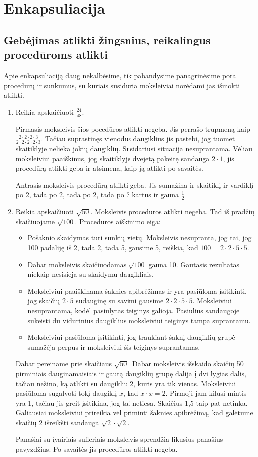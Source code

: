 \documentclass{article}
\begin{document}
\section{Enkapsuliacija}
\subsection{Gebėjimas atlikti žingsnius, reikalingus procedūroms atlikti}
Apie enkapsuliaciją daug nekalbėsime, tik pabandysime panagrinėsime pora procedūrų ir sunkumus, su kuriais susiduria moksleiviai norėdami jas išmokti atlikti.
\begin{enumerate}
\item Reikia apskaičiuoti $\frac{24}{48}$. 

Pirmasis moksleivis šios pocedūros atlikti negeba. Jis perrašo trupmeną kaip $\frac{2 \cdot 2 \cdot 2 \cdot 3}{2 \cdot 2 \cdot 2 \cdot 2 \cdot 3}$. Tačiau suprastinęs vienodus daugiklius jis pastebi, jog tuomet skaitiklyje nelieka jokių daugiklių. Susidariusi situacija nesuprantama. Vėliau moksleiviui paaiškinus, jog skaitiklyje dvejetą pakeitę sandauga $2 \cdot 1$, jis procedūrą atlikti geba ir atsimena, kaip ją atlikti po savaitės. 

Antrasis moksleivis procedūrą atlikti geba. Jis sumažina ir skaitiklį ir vardiklį po 2, tada po 2, tada po 2, tada po 3 kartus ir gauna $\frac{1}{2}$
\item Reikia apskaičiuoti $\sqrt{50}$. Moksleivis procedūros atlikti negeba. Tad iš pradžių skaičiuojame $\sqrt{100}$. Procedūros aiškinimo eiga: 
\begin{itemize}
\item Pošaknio skaidymas turi sunkių vietų. Moksleivis nesupranta, jog tai, jog 100 padaliję iš 2, tada 2, tada 5, gausime 5, reiškia, kad $100=2\cdot 2\cdot 5\cdot 5$. 
\item Dabar moksleivis skaičiuodamas $\sqrt{100}$ gauna 10. Gautasis rezultatas niekaip nesisieja su skaidymu daugikliais.
\item Moksleiviui paaiškinama šaknies apibrėžimas ir yra pasiūloma įsitikinti, jog skaičių $2\cdot 5$ sudauginę su savimi gausime $2\cdot 2\cdot 5\cdot 5$. Moksleiviui nesuprantama, kodėl pasiūlytas teiginys galioja. Pasiūlius sandaugoje sukeisti du vidurinius daugiklius moksleiviui teiginys tampa suprantamu.
\item Moksleiviui pasiūloma įsitikinti, jog traukiant šaknį daugiklių grupė sumažėja perpus ir moksleiviui šis teiginys suprantamas.
\end{itemize}
Dabar pereiname prie skaičiaus $\sqrt{50}$. Dabar moksleivis išskaido skaičių 50 pirminiais dauginamaisiais ir gautą daugiklių grupę dalija į dvi lygias dalis, tačiau nežino, ką atlikti su daugikliu 2, kuris yra tik vienas. Moksleiviui pasiūloma sugalvoti tokį daugiklį $x$, kad $x\cdot x=2$. Pirmoji jam kilusi mintis yra 1, tačiau jis greit įsitikina, jog tai netiesa. Skaičius 1,5 taip pat netinka. Galiausiai moksleiviui prireikia vėl priminti šaknies apibrėžimą, kad galėtume skaičių 2 išreikšti sandauga $\sqrt{2}\cdot \sqrt{2}$.

Panašiai su įvairiais sufleriais moksleivis sprendžia likusius panašius pavyzdžius. Po savaitės jis procedūros atlikti negeba.
\end{enumerate}
\end{document}
